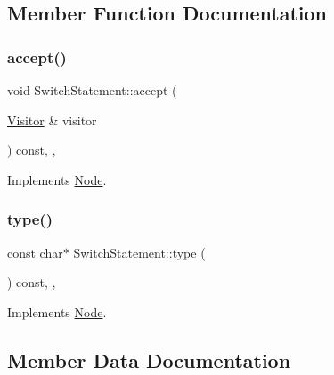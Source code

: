 \subsection{Member Function Documentation}
\mbox{\label{struct_switch_statement_a948b1d975437e623ad183d5599ce51f9}} 
\subsubsection{\texorpdfstring{accept()}{accept()}}
{\footnotesize\ttfamily void Switch\+Statement\+::accept (\begin{DoxyParamCaption}\item[{\hyperlink{struct_visitor}{Visitor} \&}]{visitor }\end{DoxyParamCaption}) const\hspace{0.3cm}{\ttfamily [inline]}, {\ttfamily [override]}, {\ttfamily [virtual]}}



Implements \hyperlink{struct_node_a10bd7af968140bbf5fa461298a969c71}{Node}.

\mbox{\label{struct_switch_statement_a58f7924f68adeef7f73b0403715182c1}} 
\subsubsection{\texorpdfstring{type()}{type()}}
{\footnotesize\ttfamily const char$\ast$ Switch\+Statement\+::type (\begin{DoxyParamCaption}{ }\end{DoxyParamCaption}) const\hspace{0.3cm}{\ttfamily [inline]}, {\ttfamily [override]}, {\ttfamily [virtual]}}



Implements \hyperlink{struct_node_a82f29420d0a38efcc370352528e94e9b}{Node}.



\subsection{Member Data Documentation}
\mbox{\label{struct_switch_statement_a2e2f296ddcb9fcb69bd4daeac8c850b0}} 

